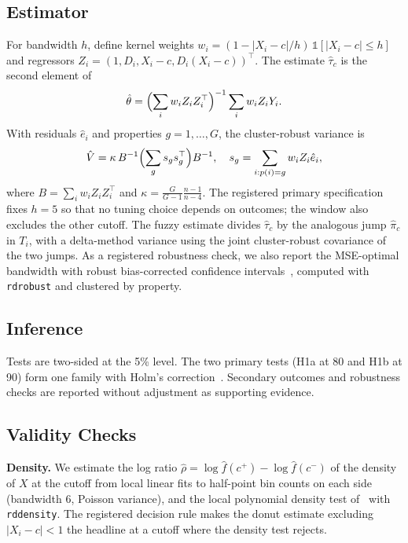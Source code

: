 \documentclass[10pt,twocolumn,letterpaper]{article}
\newcommand{\runhead}[1]{\par\vspace{0.35ex}\noindent\textbf{#1}\hspace{0.35em}}
\begin{document}
\subsection{Estimator}
For bandwidth $h$, define kernel weights $w_i=(1-|X_i-c|/h)\,\mathbb 1[|X_i-c|\le h]$ and regressors $Z_i=(1,D_i,X_i-c,D_i(X_i-c))^\top$. The estimate $\hat\tau_c$ is the second element of
\begin{equation}
\hat\theta=\Bigl(\sum_i w_iZ_iZ_i^\top\Bigr)^{-1}\sum_i w_iZ_iY_i .
\end{equation}
With residuals $\hat e_i$ and properties $g=1,\dots,G$, the cluster-robust variance is
\begin{equation}
\hat V=\kappa\,B^{-1}\Bigl(\sum_{g}s_gs_g^\top\Bigr)B^{-1},\quad s_g=\sum_{i:p(i)=g}w_iZ_i\hat e_i,
\end{equation}
where $B=\sum_iw_iZ_iZ_i^\top$ and $\kappa=\frac{G}{G-1}\frac{n-1}{n-4}$. The registered primary specification fixes $h=5$ so that no tuning choice depends on outcomes; the window also excludes the other cutoff. The fuzzy estimate divides $\hat\tau_c$ by the analogous jump $\hat\pi_c$ in $T_i$, with a delta-method variance using the joint cluster-robust covariance of the two jumps. As a registered robustness check, we also report the MSE-optimal bandwidth with robust bias-corrected confidence intervals~\cite{calonico2014}, computed with \texttt{rdrobust} and clustered by property.

\subsection{Inference}
Tests are two-sided at the 5\% level. The two primary tests (H1a at 80 and H1b at 90) form one family with Holm's correction~\cite{holm1979}. Secondary outcomes and robustness checks are reported without adjustment as supporting evidence.

\subsection{Validity Checks}
\runhead{Density.} We estimate the log ratio $\hat\rho=\log\hat f(c^+)-\log\hat f(c^-)$ of the density of $X$ at the cutoff from local linear fits to half-point bin counts on each side (bandwidth 6, Poisson variance), and the local polynomial density test of~\cite{cattaneo2020} with \texttt{rddensity}. The registered decision rule makes the donut estimate excluding $|X_i-c|<1$ the headline at a cutoff where the density test rejects.
\end{document}

